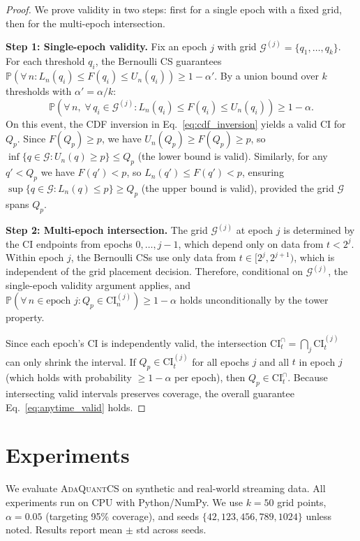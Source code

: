 \documentclass{article}
\newcommand{\Qp}{Q_p}
\newcommand{\CI}{\mathrm{CI}}
\renewcommand{\Pr}{\mathbb{P}}
\newcommand{\ours}{\textsc{AdaQuantCS}}
\begin{document}
\begin{proof}
We prove validity in two steps: first for a single epoch with a fixed grid, then for the multi-epoch intersection.

\textbf{Step 1: Single-epoch validity.} Fix an epoch $j$ with grid $\mathcal{G}^{(j)} = \{q_1, \ldots, q_k\}$. For each threshold $q_i$, the Bernoulli CS guarantees $\Pr(\forall\, n : L_n(q_i) \leq F(q_i) \leq U_n(q_i)) \geq 1 - \alpha'$. By a union bound over $k$ thresholds with $\alpha' = \alpha/k$:
\[
\Pr\!\left(\forall\, n,\; \forall\, q_i \in \mathcal{G}^{(j)} : L_n(q_i) \leq F(q_i) \leq U_n(q_i)\right) \geq 1 - \alpha.
\]
On this event, the CDF inversion in Eq.~\eqref{eq:cdf_inversion} yields a valid CI for $\Qp$. Since $F(\Qp) \geq p$, we have $U_n(\Qp) \geq F(\Qp) \geq p$, so $\inf\{q \in \mathcal{G} : U_n(q) \geq p\} \leq \Qp$ (the lower bound is valid). Similarly, for any $q' < \Qp$ we have $F(q') < p$, so $L_n(q') \leq F(q') < p$, ensuring $\sup\{q \in \mathcal{G} : L_n(q) \leq p\} \geq \Qp$ (the upper bound is valid), provided the grid $\mathcal{G}$ spans $\Qp$.

\textbf{Step 2: Multi-epoch intersection.} The grid $\mathcal{G}^{(j)}$ at epoch $j$ is determined by the CI endpoints from epochs $0, \ldots, j-1$, which depend only on data from $t < 2^j$. Within epoch $j$, the Bernoulli CSs use only data from $t \in [2^j, 2^{j+1})$, which is independent of the grid placement decision. Therefore, conditional on $\mathcal{G}^{(j)}$, the single-epoch validity argument applies, and $\Pr(\forall\, n \in \text{epoch } j : \Qp \in \CI_n^{(j)}) \geq 1 - \alpha$ holds unconditionally by the tower property.

Since each epoch's CI is independently valid, the intersection $\CI_t^{\cap} = \bigcap_j \CI_t^{(j)}$ can only shrink the interval. If $\Qp \in \CI_t^{(j)}$ for all epochs $j$ and all $t$ in epoch $j$ (which holds with probability $\geq 1 - \alpha$ per epoch), then $\Qp \in \CI_t^{\cap}$. Because intersecting valid intervals preserves coverage, the overall guarantee Eq.~\eqref{eq:anytime_valid} holds.
\end{proof}

\section{Experiments}
\label{sec:experiments}

We evaluate \ours{} on synthetic and real-world streaming data. All experiments run on CPU with Python/NumPy. We use $k = 50$ grid points, $\alpha = 0.05$ (targeting 95\% coverage), and seeds $\{42, 123, 456, 789, 1024\}$ unless noted. Results report mean $\pm$ std across seeds.
\end{document}
